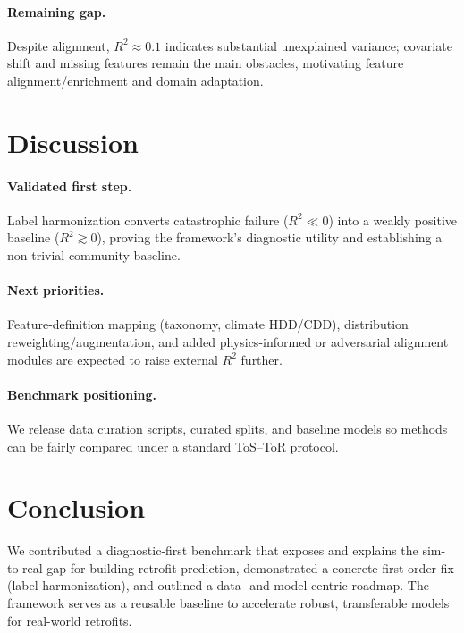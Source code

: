 \documentclass{article}
\begin{document}
\paragraph{Remaining gap.}
Despite alignment, $R^2\approx 0.1$ indicates substantial unexplained variance; covariate shift and missing features remain the main obstacles, motivating feature alignment/enrichment and domain adaptation.

\begin{table}[t]
\centering
\caption{Hybrid external evaluation on ResStock TMY3 (annual site EUI, kWh/m$^2\cdot$y).}
\label{tab:external_hybrid}
\end{table}


\section{Discussion}
\paragraph{Validated first step.}
Label harmonization converts catastrophic failure ($R^2\ll0$) into a weakly positive baseline ($R^2\gtrsim0$), proving the framework’s diagnostic utility and establishing a non-trivial community baseline.

\paragraph{Next priorities.}
Feature-definition mapping (taxonomy, climate HDD/CDD), distribution reweighting/augmentation, and added physics-informed or adversarial alignment modules are expected to raise external $R^2$ further.

\paragraph{Benchmark positioning.}
We release data curation scripts, curated splits, and baseline models so methods can be fairly compared under a standard ToS--ToR protocol.

\section{Conclusion}
We contributed a diagnostic-first benchmark that exposes and explains the sim-to-real gap for building retrofit prediction, demonstrated a concrete first-order fix (label harmonization), and outlined a data- and model-centric roadmap. The framework serves as a reusable baseline to accelerate robust, transferable models for real-world retrofits.
\end{document}
